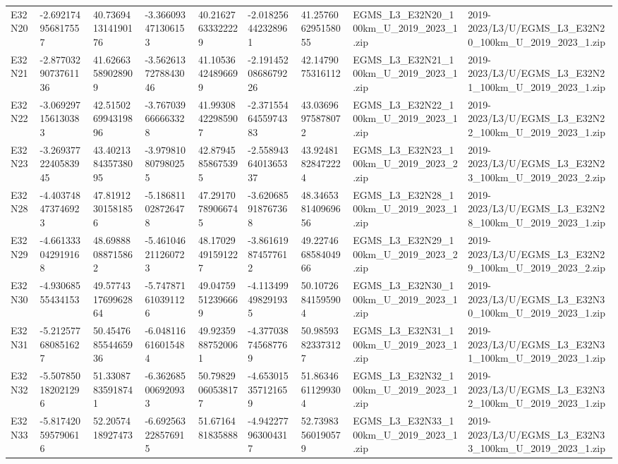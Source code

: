 \begin{landscape}
\begin{longtable}{lllllllll}
E32N20 & -2.692174956817557 & 40.736941314190176 & -3.366093471306153 & 40.21627633322229 & -2.018256442328961 & 41.257606295158055 & EGMS\_L3\_E32N20\_100km\_U\_2019\_2023\_1.zip & 2019-2023/L3/U/EGMS\_L3\_E32N20\_100km\_U\_2019\_2023\_1.zip \\
E32N21 & -2.8770329073761136 & 41.62663589028909 & -3.5626137278843046 & 41.10536424896699 & -2.1914520868679226 & 42.1479075316112 & EGMS\_L3\_E32N21\_100km\_U\_2019\_2023\_1.zip & 2019-2023/L3/U/EGMS\_L3\_E32N21\_100km\_U\_2019\_2023\_1.zip \\
E32N22 & -3.069297156130383 & 42.515026994319896 & -3.767039666663328 & 41.99308422985907 & -2.3715546455974383 & 43.03696975878072 & EGMS\_L3\_E32N22\_100km\_U\_2019\_2023\_1.zip & 2019-2023/L3/U/EGMS\_L3\_E32N22\_100km\_U\_2019\_2023\_1.zip \\
E32N23 & -3.2693772240583945 & 43.402138435738095 & -3.979810807980255 & 42.87945858675395 & -2.5589436401365337 & 43.92481828472224 & EGMS\_L3\_E32N23\_100km\_U\_2019\_2023\_2.zip & 2019-2023/L3/U/EGMS\_L3\_E32N23\_100km\_U\_2019\_2023\_2.zip \\
E32N28 & -4.403748473746923 & 47.81912301581856 & -5.186811028726478 & 47.29170789066745 & -3.620685918767368 & 48.346538140969656 & EGMS\_L3\_E32N28\_100km\_U\_2019\_2023\_1.zip & 2019-2023/L3/U/EGMS\_L3\_E32N28\_100km\_U\_2019\_2023\_1.zip \\
E32N29 & -4.661333042919168 & 48.69888088715862 & -5.461046211260723 & 48.17029491591227 & -3.861619874577612 & 49.227466858404966 & EGMS\_L3\_E32N29\_100km\_U\_2019\_2023\_2.zip & 2019-2023/L3/U/EGMS\_L3\_E32N29\_100km\_U\_2019\_2023\_2.zip \\
E32N30 & -4.93068555434153 & 49.577431769962864 & -5.747871610391126 & 49.04759512396669 & -4.113499498291935 & 50.10726841595904 & EGMS\_L3\_E32N30\_100km\_U\_2019\_2023\_1.zip & 2019-2023/L3/U/EGMS\_L3\_E32N30\_100km\_U\_2019\_2023\_1.zip \\
E32N31 & -5.212577680851627 & 50.454768554465936 & -6.048116616015484 & 49.92359887520061 & -4.377038745687769 & 50.98593823373127 & EGMS\_L3\_E32N31\_100km\_U\_2019\_2023\_1.zip & 2019-2023/L3/U/EGMS\_L3\_E32N31\_100km\_U\_2019\_2023\_1.zip \\
E32N32 & -5.507850182021296 & 51.33087835918741 & -6.362685006920933 & 50.79829060538177 & -4.653015357121659 & 51.86346611299304 & EGMS\_L3\_E32N32\_100km\_U\_2019\_2023\_1.zip & 2019-2023/L3/U/EGMS\_L3\_E32N32\_100km\_U\_2019\_2023\_1.zip \\
E32N33 & -5.817420595790616 & 52.2057418927473 & -6.692563228576915 & 51.6716481835888 & -4.942277963004317 & 52.73983560190579 & EGMS\_L3\_E32N33\_100km\_U\_2019\_2023\_1.zip & 2019-2023/L3/U/EGMS\_L3\_E32N33\_100km\_U\_2019\_2023\_1.zip \\

\end{longtable}
\end{landscape}
